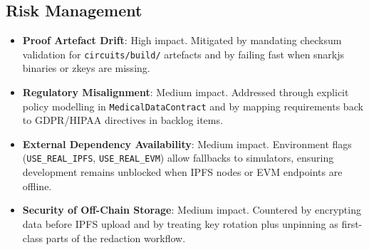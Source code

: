 \subsection{Risk Management}
\begin{itemize}
    \item \textbf{Proof Artefact Drift}: High impact. Mitigated by mandating checksum validation for \texttt{circuits/build/} artefacts and by failing fast when snarkjs binaries or zkeys are missing.
    \item \textbf{Regulatory Misalignment}: Medium impact. Addressed through explicit policy modelling in \texttt{MedicalDataContract} and by mapping requirements back to GDPR/HIPAA directives in backlog items.
    \item \textbf{External Dependency Availability}: Medium impact. Environment flags (\texttt{USE\_REAL\_IPFS}, \texttt{USE\_REAL\_EVM}) allow fallbacks to simulators, ensuring development remains unblocked when IPFS nodes or EVM endpoints are offline.
    \item \textbf{Security of Off-Chain Storage}: Medium impact. Countered by encrypting data before IPFS upload and by treating key rotation plus unpinning as first-class parts of the redaction workflow.
\end{itemize}
